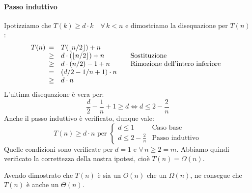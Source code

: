 \begin{eg}
    \paragraph{Passo induttivo} Ipotizziamo che $T(k)\geq d\cdot k\quad\forall\,k<n$
    e dimostriamo la disequazione per $T(n)$:
    \[T(n)\begin{array}[t]{cll}
        = & T(\lfloor n/2\rfloor)+n & \\
        \geq & d\cdot(\lfloor n/2\rfloor) + n & \quad\text{Sostituzione}\\
        \geq & d\cdot(n/2) - 1 + n & \quad\text{Rimozione dell'intero inferiore}\\
        = & (d/2-1/n+1)\cdot n\\
        \geq & d\cdot n
    \end{array}\]
    L'ultima disequazione è vera per:
    \[\frac{d}{2}-\frac{1}{n}+1\geq d\Leftrightarrow d\leq2-\frac{2}{n}\]
    Anche il passo induttivo è verificato, dunque vale:
    \[T(n)\geq d\cdot n\text{ per }\begin{cases}
        d\leq 1 & \text{Caso base}\\
        d\leq 2-\frac{2}{n} & \text{Passo induttivo}
    \end{cases}\]
    Quelle condizioni sono verificate per $d=1$ e $\forall\,n\geq2=m$.
    Abbiamo quindi verificato la correttezza della nostra ipotesi, cioè
    $T(n)=\Omega(n)$.

    \bigskip\noindent
    Avendo dimostrato che $T(n)$ è sia un $O(n)$ che un $\Omega(n)$, ne
    consegue che $T(n)$ è anche un $\Theta(n)$.
\end{eg}

